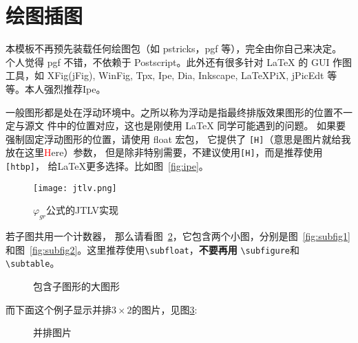 \section{绘图插图}

本模板不再预先装载任何绘图包（如 \textsf{pstricks，pgf} 等），完全由你自己来决定。
个人觉得 \textsf{pgf} 不错，不依赖于 Postscript。此外还有很多针对 \LaTeX{} 的
 GUI 作图工具，如 XFig(jFig), WinFig, Tpx, Ipe, Dia, Inkscape, LaTeXPiX,
jPicEdt 等等。本人强烈推荐\textsf{Ipe}。

一般图形都是处在浮动环境中。之所以称为浮动是指最终排版效果图形的位置不一定与源文
件中的位置对应，这也是刚使用 \LaTeX{} 同学可能遇到的问题。
如果要强制固定浮动图形的位置，请使用 \textsf{float} 宏包，
它提供了 \texttt{[H]}（意思是图片就给我放在这里\textcolor{red}{H}ere）参数，
但是除非特别需要，不建议使用\texttt{[H]}，而是推荐使用\texttt{[htbp]}，
给\LaTeX{}更多选择。比如图~\ref{fig:ipe}。
\begin{figure}[htbp] %
  \centering
  \texttt{[image: jtlv.png]}
  \caption{$\varphi_{gr}$公式的JTLV实现}
  \label{fig:jtlv}
\end{figure}

若子图共用一个计数器，
那么请看图~\ref{fig:big1}，它包含两个小图，分别是图~\ref{fig:subfig1} 
和图~\ref{fig:subfig2}。这里推荐使用\verb|\subfloat|，{\bf 不要再用}
\verb|\subfigure|和\verb|\subtable|。
\begin{figure}[htb]
  \centering%
  \subfloat[第一个小图形]{%
    \label{fig:subfig1}
    \texttt{[image: xh]}}\hspace{4em}%
  \caption{包含子图形的大图形}
  \label{fig:big1}
\end{figure}

而下面这个例子显示并排$3\times2$的图片，见图\ref{fig:subfig:3x2}:
\begin{figure}[htb]
\centering
{} \qquad
{} \qquad
{} \qquad
{} \qquad
{} \qquad
{}
\caption{并排图片}
\label{fig:subfig:3x2}
\end{figure}

